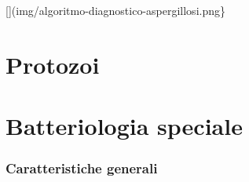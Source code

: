 \documentclass[italian,]{article}
\begin{document}
{[}{]}(img/algoritmo-diagnostico-aspergillosi.png\}

\clearpage
\part{Protozoi}

\clearpage
\part{Batteriologia speciale}

\hypertarget{caratteristiche-generali-1}{%
\section{Caratteristiche generali}\label{caratteristiche-generali-1}}
\end{document}
